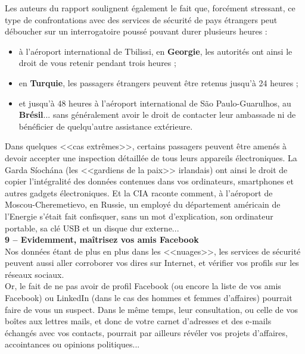 \documentclass[11pt,twoside,a4paper]{article}
\begin{document}
Les auteurs du rapport soulignent {\'e}galement le fait que, forc{\'e}ment stressant, ce type de confrontations avec des services de s{\'e}curit{\'e} de pays {\'e}trangers peut d{\'e}boucher sur un interrogatoire pouss{\'e} pouvant durer plusieurs heures : 
\begin{itemize}
	\item {\`a} l'a{\'e}roport international de Tbilissi, en \textbf{Georgie}, les autorit{\'e}s ont ainsi le droit de vous retenir pendant trois heures ;
	\item en \textbf{Turquie}, les passagers {\'e}trangers peuvent {\^e}tre retenus jusqu'{\`a} 24 heures ;
	\item et jusqu'{\`a} 48 heures {\`a} l'a{\'e}roport international de São Paulo-Guarulhos, au \textbf{Br{\'e}sil}... sans g{\'e}n{\'e}ralement avoir le droit de contacter leur ambassade ni de b{\'e}n{\'e}ficier de quelqu'autre assistance ext{\'e}rieure.
\end{itemize}

Dans quelques <<cas extr{\^e}mes>>, certains passagers peuvent {\^e}tre amen{\'e}s {\`a} devoir accepter une inspection d{\'e}taill{\'e}e de tous leurs appareils {\'e}lectroniques. La Garda Síochána (les <<gardiens de la paix>> irlandais) ont ainsi le droit de copier l'int{\'e}gralit{\'e} des donn{\'e}es contenues dans vos ordinateurs, smartphones et autres gadgets {\'e}lectroniques. Et la CIA raconte comment, {\`a} l'a{\'e}roport de Moscou-Cheremetievo, en Russie, un employ{\'e} du d{\'e}partement am{\'e}ricain de l'Energie s'{\'e}tait fait confisquer, sans un mot d'explication, son ordinateur portable, sa cl{\'e} USB et un disque dur externe... ~\\

\textbf{\large 9 -- Evidemment, ma{\^i}trisez vos amis Facebook}~\\

Nos donn{\'e}es {\'e}tant de plus en plus dans les <<nuages>>, les services de s{\'e}curit{\'e} peuvent aussi aller corroborer vos dires sur Internet, et v{\'e}rifier vos profils sur les r{\'e}seaux sociaux. ~\\

Or, le fait de ne pas avoir de profil Facebook (ou encore la liste de vos amis Facebook) ou LinkedIn (dans le cas des hommes et femmes d'affaires) pourrait faire de vous un suspect. Dans le m{\^e}me temps, leur consultation, ou celle de vos bo{\^i}tes aux lettres mails, et donc de votre carnet d'adresses et des e-mails {\'e}chang{\'e}s avec vos contacts, pourrait par ailleurs r{\'e}v{\'e}ler vos projets d'affaires, accointances ou opinions politiques... ~\\
\end{document}
